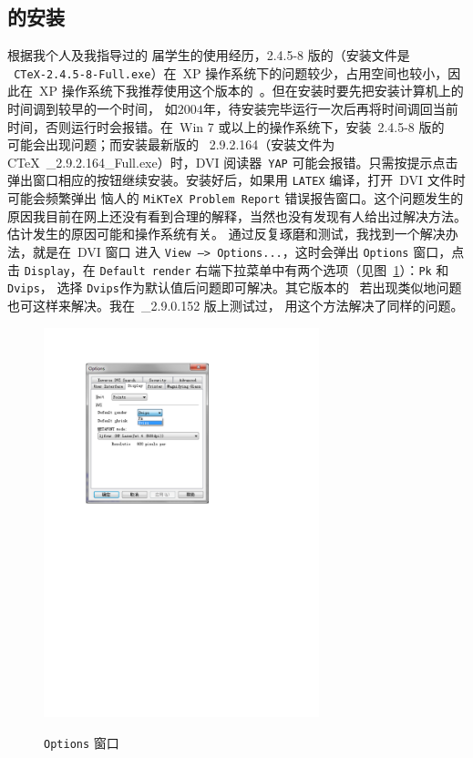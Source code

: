\subsection{\CTeX{} 的安装}\label{sec:versionSelect}
根据我个人及我指导过的 \nianxian 届学生的使用经历，2.4.5-8 版的\CTeX （安装文件是\\{\tt
	CTeX-2.4.5-8-Full.exe}）在~XP 操作系统下的问题较少，占用空间也较小，因此在~XP 操作系统下我推荐使用这个版本的~\CTeX。但在安装时要先把安装计算机上的时间调到较早的一个时间，
如$2004$年，待安装完毕运行一次后再将时间调回当前时间，否则运行时会报错。在~Win 7 或以上的操作系统下，安装~2.4.5-8 版的~\CTeX{} 可能会出现问题；而安装最新版的~
2.9.2.164（安装文件为~
CTeX~\_2.9.2.164\_Full.exe）时，DVI 阅读器~{\tt YAP} 可能会报错。只需按提示点击弹出窗口相应的按钮继续安装。安装好后，如果用{ \tt LATEX} 编译，打开~DVI 文件时可能会频繁弹出
恼人的{ \tt MiKTeX Problem Report} 错误报告窗口。这个问题发生的原因我目前在网上还没有看到合理的解释，当然也没有发现有人给出过解决方法。估计发生的原因可能和操作系统有关。
通过反复琢磨和测试，我找到一个解决办法，就是在~DVI 窗口
进入{ \tt View --> Options...}，这时会弹出{ \tt Options} 窗口，点击{ \tt Display}，在{ \tt Default render} 右端下拉菜单中有两个选项（见图~\ref{fig:optionWin}）：{\tt Pk} 和{ \tt Dvips}，
选择{ \tt Dvips}作为默认值后问题即可解决。其它版本的~\CTeX{} 若出现类似地问题也可这样来解决。我在~\CTeX\_2.9.0.152 版上测试过，
用这个方法解决了同样的问题。
\begin{figure}
	\centering
	\includegraphics[width=8cm]{codes/292164wenti}\\
	\caption{{\tt Options} 窗口}\label{fig:optionWin}
\end{figure}
